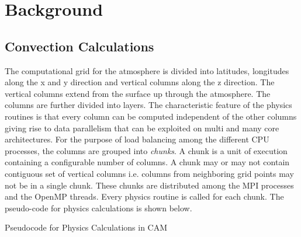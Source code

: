 \section{Background}
\label{back}

\subsection{Convection Calculations}

The computational grid for the atmosphere is divided into latitudes, longitudes along the x and y direction and vertical columns along the z direction. The vertical columns extend from the surface up through the atmosphere. The columns are further divided into layers. The characteristic feature of the physics routines is that every column can be computed independent of the other columns giving rise to data parallelism that can be exploited on multi and many core architectures. For the purpose of load balancing among the different CPU processes, the columns are grouped into {\em chunks}. A chunk is a unit of execution containing a configurable number of columns. A chunk may or may not contain contiguous set of vertical columns i.e. columns from neighboring grid points may not be in a single chunk. These chunks are distributed among the MPI processes and the OpenMP threads. Every physics routine is called for each chunk. The pseudo-code for physics calculations is shown below.

\begin{algorithm}
\begin{small}

\caption{Pseudocode for Physics Calculations in CAM}
\label{physics_pseudo}
\end{small}
\end{algorithm}

